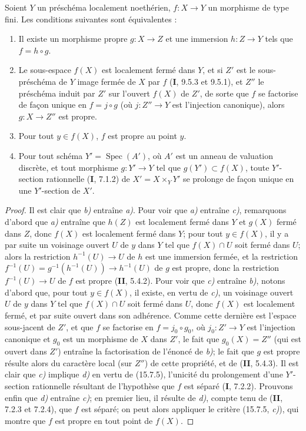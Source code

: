 \begin{corollary}[15.7.6]
\label{IV.15.7.6-fr}
Soient $Y$ un préschéma localement noethérien, $f:X\to Y$ un morphisme de type fini. Les conditions suivantes sont équivalentes :
\begin{enumerate}
  \item[\rm a)] Il existe un morphisme propre $g:X\to Z$ et une immersion $h:Z\to Y$ tels que $f=h\circ g$.
  \item[\rm b)] Le sous-espace $f(X)$ est localement fermé dans $Y$, et si $Z'$ est le sous-préschéma de $Y$ image fermée de $X$ par $f$ \textup{(\textbf{I}, 9.5.3 et 9.5.1)}, et $Z''$ le préschéma induit par $Z'$ sur l'ouvert $f(X)$ de $Z'$, de sorte que $f$ se factorise de façon unique en $f=j\circ g$ (où $j:Z''\to Y$ est l'injection canonique), alors $g:X\to Z''$ est propre.
  \item[\rm c)] Pour tout $y\in f(X)$, $f$ est propre au point $y$.
  \item[\rm d)] Pour tout schéma $Y'=\operatorname{Spec}(A')$, où $A'$ est un anneau de valuation discrète, et tout morphisme $g:Y'\to Y$ tel que $g(Y')\subset f(X)$, toute $Y'$-section rationnelle \textup{(\textbf{I}, 7.1.2)} de $X'=X\times_Y Y'$ se prolonge de façon unique en une $Y'$-section de $X'$.
\end{enumerate}
\end{corollary}

\begin{proof}
Il est clair que \emph{b)} entraîne \emph{a)}. Pour voir que \emph{a)} entraîne \emph{c)}, remarquons d'abord que \emph{a)} entraîne que $h(Z)$ est localement fermé dans $Y$ et $g(X)$ fermé dans $Z$, donc $f(X)$ est localement fermé dans $Y$; pour tout $y\in f(X)$, il y a par suite un voisinage ouvert $U$
de $y$ dans $Y$ tel que $f(X)\cap U$ soit fermé dans $U$; alors la restriction $h^{-1}(U)\to U$ de $h$ est une immersion fermée, et la restriction $f^{-1}(U)=g^{-1}(h^{-1}(U))\to h^{-1}(U)$ de $g$ est propre, donc la restriction $f^{-1}(U)\to U$ de $f$ est propre (\textbf{II}, 5.4.2). Pour voir que \emph{c)} entraîne \emph{b)}, notons d'abord que, pour tout $y\in f(X)$, il existe, en vertu de \emph{c)}, un voisinage ouvert $U$ de $y$ dans $Y$ tel que $f(X)\cap U$ soit fermé dans $U$, donc $f(X)$ est localement fermé, et par suite ouvert dans son adhérence. Comme cette dernière est l'espace sous-jacent de $Z'$, et que $f$ se factorise en $f=j_0\circ g_0$, où $j_0:Z'\to Y$ est l'injection canonique et $g_0$ est un morphisme de $X$ dans $Z'$, le fait que $g_0(X)=Z''$ (qui est ouvert dans $Z'$) entraîne la factorisation de l'énoncé de \emph{b)}; le fait que $g$ est propre résulte alors du caractère local (sur $Z''$) de cette propriété, et de (\textbf{II}, 5.4.3). Il est clair que \emph{c)} implique \emph{d)} en vertu de (15.7.5), l'unicité du prolongement d'une $Y'$-section rationnelle résultant de l'hypothèse que $f$ est séparé (\textbf{I}, 7.2.2). Prouvons enfin que \emph{d)} entraîne \emph{c)}; en premier lieu, il résulte de \emph{d)}, compte tenu de (\textbf{II}, 7.2.3 et 7.2.4), que $f$ est séparé; on peut alors appliquer le critère (15.7.5, \emph{c)}), qui montre que $f$ est propre en tout point de $f(X)$.
\end{proof}

